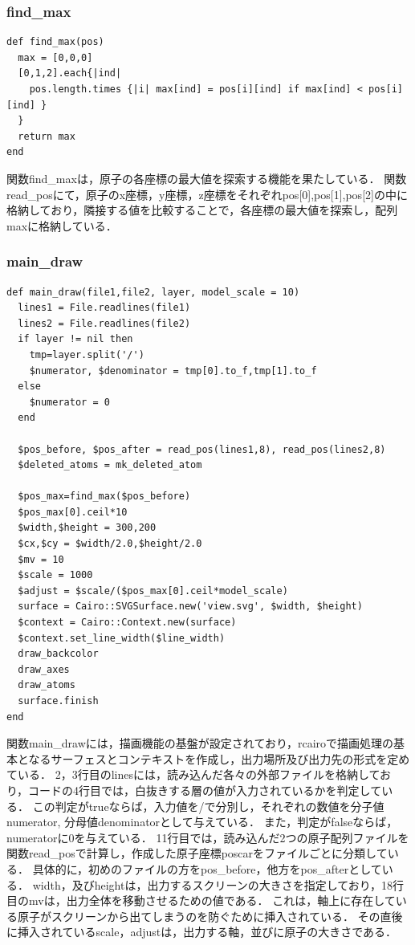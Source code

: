 \subsubsection{find\_max}\begin{lstlisting}[style=customRuby,basicstyle={\scriptsize\ttfamily}]
def find_max(pos)
  max = [0,0,0]
  [0,1,2].each{|ind|
    pos.length.times {|i| max[ind] = pos[i][ind] if max[ind] < pos[i][ind] }
  }
  return max
end
\end{lstlisting}
関数find\_maxは，原子の各座標の最大値を探索する機能を果たしている．
関数read\_posにて，原子のx座標，y座標，z座標をそれぞれpos[0],pos[1],pos[2]の中に格納しており，隣接する値を比較することで，各座標の最大値を探索し，配列maxに格納している．

\subsubsection{main\_draw}\begin{lstlisting}[style=customRuby,basicstyle={\scriptsize\ttfamily}]
def main_draw(file1,file2, layer, model_scale = 10)
  lines1 = File.readlines(file1)
  lines2 = File.readlines(file2)
  if layer != nil then
    tmp=layer.split('/')
    $numerator, $denominator = tmp[0].to_f,tmp[1].to_f
  else
    $numerator = 0
  end
  
  $pos_before, $pos_after = read_pos(lines1,8), read_pos(lines2,8)
  $deleted_atoms = mk_deleted_atom
  
  $pos_max=find_max($pos_before)
  $pos_max[0].ceil*10
  $width,$height = 300,200
  $cx,$cy = $width/2.0,$height/2.0
  $mv = 10
  $scale = 1000
  $adjust = $scale/($pos_max[0].ceil*model_scale)
  surface = Cairo::SVGSurface.new('view.svg', $width, $height)
  $context = Cairo::Context.new(surface)
  $context.set_line_width($line_width)
  draw_backcolor
  draw_axes
  draw_atoms
  surface.finish
end
\end{lstlisting}
関数main\_drawには，描画機能の基盤が設定されており，rcairoで描画処理の基本となるサーフェスとコンテキストを作成し，出力場所及び出力先の形式を定めている．
2，3行目のlinesには，読み込んだ各々の外部ファイルを格納しており，コードの4行目では，白抜きする層の値が入力されているかを判定している．
この判定がtrueならば，入力値を/で分別し，それぞれの数値を分子値numerator, 分母値denominatorとして与えている．
また，判定がfalseならば，numeratorに0を与えている．
11行目では，読み込んだ2つの原子配列ファイルを関数read\_posで計算し，作成した原子座標poscarをファイルごとに分類している．
具体的に，初めのファイルの方をpos\_before，他方をpos\_afterとしている．
width，及びheightは，出力するスクリーンの大きさを指定しており，18行目のmvは，出力全体を移動させるための値である．
これは，軸上に存在している原子がスクリーンから出てしまうのを防ぐために挿入されている．
その直後に挿入されているscale，adjustは，出力する軸，並びに原子の大きさである．


